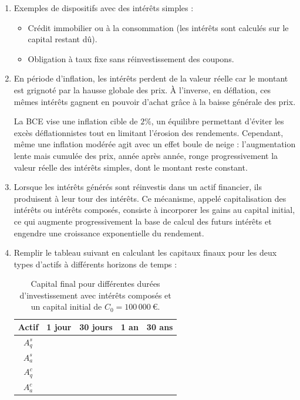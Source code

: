 \documentclass{article}
\begin{document}
\begin{enumerate}[label=\textbf{R1.\arabic*}]
    \item Exemples de dispositifs avec des intérêts simples :
    \begin{itemize}
        \item Crédit immobilier ou à la consommation (les intérêts  sont calculés sur le capital restant dû).
        \item Obligation à taux fixe sans réinvestissement des coupons.
    \end{itemize}

    \item En période d'inflation, les intérêts perdent de la valeur réelle car le montant est grignoté par la hausse globale des prix. À l’inverse, en déflation, ces mêmes intérêts gagnent en pouvoir d’achat grâce à la baisse générale des prix. 

    La BCE vise une inflation cible de \( 2\% \), un équilibre permettant d’éviter les excès déflationnistes tout en limitant l’érosion des rendements. Cependant, même une inflation modérée agit avec un effet boule de neige : l’augmentation lente mais cumulée des prix, année après année, ronge progressivement la valeur réelle des intérêts simples, dont le montant reste constant.

    \item Lorsque les intérêts générés sont réinvestis dans un actif financier, ils produisent à leur tour des intérêts. Ce mécanisme, appelé capitalisation des intérêts ou intérêts composés, consiste à incorporer les gains au capital initial, ce qui augmente progressivement la base de calcul des futurs intérêts et engendre une croissance exponentielle du rendement.

    \item Remplir le tableau suivant en calculant les capitaux finaux pour les deux types d'actifs à différents horizons de temps :\\
        \begin{table}[h!]
            \centering
            \begin{tabular}{|c|c|c|c|c|}
            \hline
            \textbf{Actif} & \textbf{1 jour} & \textbf{30 jours} & \textbf{1 an} & \textbf{30 ans} \\
            \hline
            \( A_q^s \) & & & & \\
            \hline
            \( A_a^s \) & & & & \\
            \hline
            \( A_q^c \) & & & & \\
            \hline
            \( A_a^c \) & & & & \\
            \hline
            \end{tabular}
            \caption{Capital final pour différentes durées d'investissement avec intérêts composés et un capital initial de \( C_0 = 100\,000\ \text{€} \).}
            \label{tab:simple_interest_results}
        \end{table}


\end{enumerate}
\end{document}
